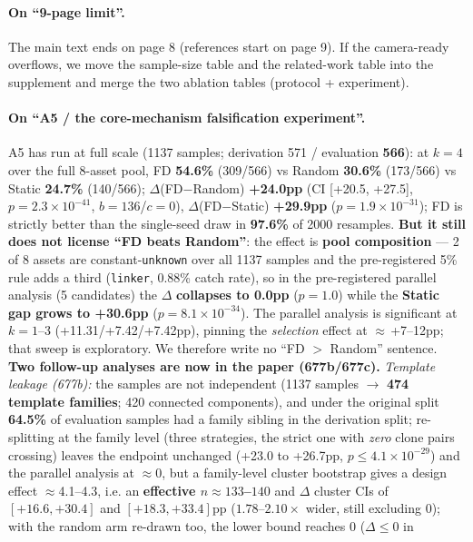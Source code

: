 \documentclass[11pt]{article}
\begin{document}
\paragraph{On ``9-page limit''.}
The main text ends on page 8 (references start on page 9). If the camera-ready overflows, we move
the sample-size table and the related-work table into the supplement and merge the two ablation
tables (protocol + experiment).

\paragraph{On ``A5 / the core-mechanism falsification experiment''.}
A5 has run at full scale (1137 samples; derivation 571 / evaluation \textbf{566}): at $k{=}4$ over
the full 8-asset pool, FD \textbf{54.6\%} (309/566) vs Random \textbf{30.6\%} (173/566) vs Static
\textbf{24.7\%} (140/566); $\Delta$(FD$-$Random) \textbf{+24.0pp} (CI [+20.5, +27.5],
$p{=}2.3\times10^{-41}$, $b{=}136$/$c{=}0$), $\Delta$(FD$-$Static) \textbf{+29.9pp}
($p{=}1.9\times10^{-31}$); FD is strictly better than the single-seed draw in \textbf{97.6\%} of
2000 resamples. \textbf{But it still does not license ``FD beats Random''}: the effect is
\textbf{pool composition} --- 2 of 8 assets are constant-\texttt{unknown} over all 1137 samples and
the pre-registered 5\% rule adds a third (\texttt{linker}, 0.88\% catch rate), so in the
pre-registered parallel analysis (5 candidates) the $\Delta$ \textbf{collapses to 0.0pp}
($p{=}1.0$) while the \textbf{Static gap grows to +30.6pp} ($p{=}8.1\times10^{-34}$). The parallel
analysis is significant at $k{=}1$--3 (+11.31/+7.42/+7.42pp), pinning the \emph{selection} effect at
$\approx$\,+7--12pp; that sweep is exploratory. We therefore write no ``FD $>$ Random'' sentence.
\textbf{Two follow-up analyses are now in the paper (677b/677c).} \emph{Template leakage (677b):}
the samples are not independent (1137 samples $\to$ \textbf{474 template families}; 420 connected
components), and under the original split \textbf{64.5\%} of evaluation samples had a family sibling
in the derivation split; re-splitting at the family level (three strategies, the strict one with
\emph{zero} clone pairs crossing) leaves the endpoint unchanged (+23.0 to +26.7pp,
$p\le4.1\times10^{-29}$) and the parallel analysis at $\approx$0, but a family-level cluster
bootstrap gives a design effect $\approx$4.1--4.3, i.e. an \textbf{effective $n\approx133$--$140$} and
$\Delta$ cluster CIs of $[+16.6,+30.4]$ and $[+18.3,+33.4]$pp ($1.78$--$2.10\times$ wider, still
excluding 0); with the random arm re-drawn too, the lower bound reaches 0 ($\Delta\le0$ in
\end{document}
